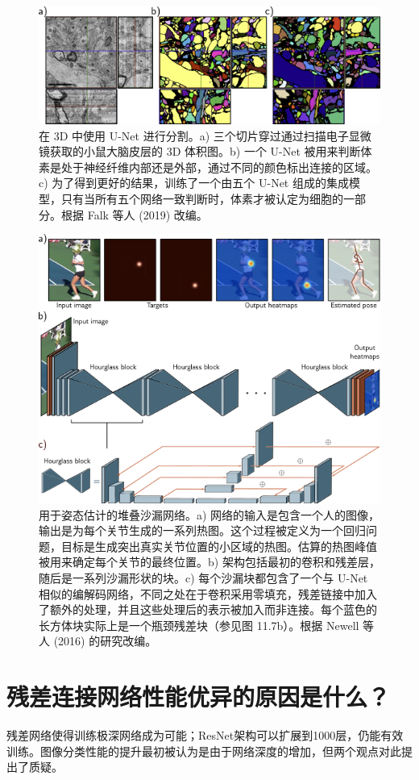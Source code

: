 \begin{figure}[ht!]
\centering
\includegraphics[width=0.7\linewidth]{png/chapter11/ResidualUNetResults.png}
\caption{在 3D 中使用 U-Net 进行分割。a) 三个切片穿过通过扫描电子显微镜获取的小鼠大脑皮层的 3D 体积图。b) 一个 U-Net 被用来判断体素是处于神经纤维内部还是外部，通过不同的颜色标出连接的区域。c) 为了得到更好的结果，训练了一个由五个 U-Net 组成的集成模型，只有当所有五个网络一致判断时，体素才被认定为细胞的一部分。根据 Falk 等人 (2019) 改编。}
\end{figure}


\begin{figure}[ht!]
\centering
\includegraphics[width=0.7\linewidth]{png/chapter11/ResidualStackedHourglass.png}
\caption{用于姿态估计的堆叠沙漏网络。a) 网络的输入是包含一个人的图像，输出是为每个关节生成的一系列热图。这个过程被定义为一个回归问题，目标是生成突出真实关节位置的小区域的热图。估算的热图峰值被用来确定每个关节的最终位置。b) 架构包括最初的卷积和残差层，随后是一系列沙漏形状的块。c) 每个沙漏块都包含了一个与 U-Net 相似的编解码网络，不同之处在于卷积采用零填充，残差链接中加入了额外的处理，并且这些处理后的表示被加入而非连接。每个蓝色的长方体块实际上是一个瓶颈残差块（参见图 11.7b）。根据 Newell 等人 (2016) 的研究改编。}
\end{figure}


\section{残差连接网络性能优异的原因是什么？}
残差网络使得训练极深网络成为可能；ResNet架构可以扩展到1000层，仍能有效训练。图像分类性能的提升最初被认为是由于网络深度的增加，但两个观点对此提出了质疑。

